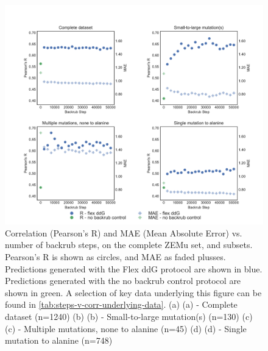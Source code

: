 \begin{figure}
  \includegraphics[width=\textwidth,keepaspectratio]{steps-v-corr.pdf}
  \caption[Flex ddG performance vs. number of backrub steps]{
    Correlation (Pearson's R) and MAE (Mean Absolute Error) vs. number of backrub steps, on the complete ZEMu set, and subsets.
    Pearson's R is shown as circles, and MAE as faded plusses.
Predictions generated with the Flex ddG protocol are shown in blue.
Predictions generated with the no backrub control protocol are shown in green.
    A selection of key data underlying this figure can be found in \cref{tab:steps-v-corr-underlying-data}.
    (a) (a) - Complete dataset (n=1240)
    (b) (b) - Small-to-large mutation(s) (n=130)
    (c) (c) - Multiple mutations, none to alanine (n=45)
    (d) (d) - Single mutation to alanine (n=748)
  } \label{fig:steps-v-corr}
\end{figure}
